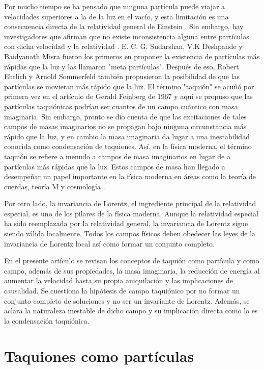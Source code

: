 \documentclass[twocolumn,preprintnumbers,amsmath,amssymb]{revtex4}
\begin{document}
Por mucho tiempo se ha pensado que ninguna partícula puede viajar a velocidades superiores a la de la luz en el vacío, y esta limitación es una consecuencia directa de la relatividad general de Einstein \cite{hill2012einstein}. Sin embargo, hay investigadores que afirman que no existe inconsistencia alguna entre partículas con dicha velocidad y la relatividad \cite{bilaniuk1969particles}. E. C. G. Sudarshan, V.K Deshpande y Baidyanath Misra fueron los primeros en proponer la existencia de partículas más rápidas que la luz y las llamaron "meta partículas". Después de eso, Robert Ehrlich y Arnold Sommerfeld también propusieron la posibilidad de que las partículas se movieran más rápido que la luz. El término "taquión" se acuñó por primera vez en el artículo de Gerald Feinberg de 1967 \cite{feinberg1967possibility} y aquí se propuso que las partículas taquiónicas podrían ser cuantos de un campo cuántico con masa imaginaria. Sin embargo, pronto se dio cuenta de que las excitaciones de tales campos de masas imaginarios no se propagan bajo ninguna circunstancia más rápido que la luz, y en cambio la masa imaginaria da lugar a una inestabilidad conocida como condensación de taquiones. Así, en la física moderna, el término taquión se refiere a menudo a campos de masa imaginarios en lugar de a partículas más rápidas que la luz. Estos campos de masa han llegado a desempeñar un papel importante en la física moderna en áreas como la teoría de cuerdas, teoría M y cosmología \cite{Randall:900484}.

Por otro lado, la invariancia de Lorentz, el ingrediente principal de la relatividad especial, es uno de los pilares de la física moderna. Aunque la relatividad especial ha sido reemplazada por la relatividad general, la invariancia de Lorentz sigue siendo válida localmente. Todos los campos físicos deben obedecer las leyes de la invariancia de Lorentz local así  como formar un conjunto completo.


En el presente artículo se revisan los conceptos de taquión como partícula y como campo, además de sus propiedades, la masa imaginaria, la reducción de energía al aumentar la velocidad hasta su propia aniquilación y las implicaciones de causalidad. Se cuestiona la hipótesis de campo taquiónico por no formar un conjunto completo de soluciones y no ser un invariante de Lorentz. Además, se aclara la naturaleza inestable de dicho campo y su implicación directa como lo es la condensación taquiónica.

\section{Taquiones como partículas}
\end{document}
